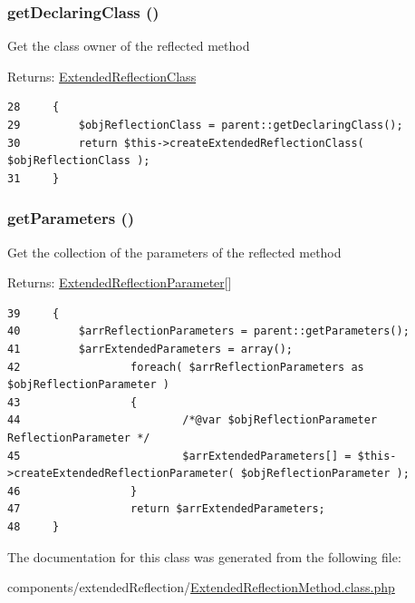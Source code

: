 \hypertarget{class_extended_reflection_method_acff3f8d93cc250281f0f73bff3422e1}{
\subsubsection[{getDeclaringClass}]{\setlength{\rightskip}{0pt plus 5cm}getDeclaringClass ()}}
\label{class_extended_reflection_method_acff3f8d93cc250281f0f73bff3422e1}


Get the class owner of the reflected method

\begin{Desc}
\item[Returns:]\hyperlink{class_extended_reflection_class}{ExtendedReflectionClass} \end{Desc}


\begin{Code}\begin{verbatim}28     {
29         $objReflectionClass = parent::getDeclaringClass();
30         return $this->createExtendedReflectionClass( $objReflectionClass );
31     }
\end{verbatim}
\end{Code}


\hypertarget{class_extended_reflection_method_015cb52e5774a1972d296c9694d2a3c3}{
\subsubsection[{getParameters}]{\setlength{\rightskip}{0pt plus 5cm}getParameters ()}}
\label{class_extended_reflection_method_015cb52e5774a1972d296c9694d2a3c3}


Get the collection of the parameters of the reflected method

\begin{Desc}
\item[Returns:]\hyperlink{class_extended_reflection_parameter}{ExtendedReflectionParameter}\mbox{[}\mbox{]} \end{Desc}


\begin{Code}\begin{verbatim}39     {
40         $arrReflectionParameters = parent::getParameters();
41         $arrExtendedParameters = array();
42                 foreach( $arrReflectionParameters as $objReflectionParameter )
43                 {
44                         /*@var $objReflectionParameter ReflectionParameter */
45                         $arrExtendedParameters[] = $this->createExtendedReflectionParameter( $objReflectionParameter );
46                 }
47                 return $arrExtendedParameters;
48     }
\end{verbatim}
\end{Code}




The documentation for this class was generated from the following file:\begin{CompactItemize}
\item 
components/extendedReflection/\hyperlink{_extended_reflection_method_8class_8php}{ExtendedReflectionMethod.class.php}\end{CompactItemize}
